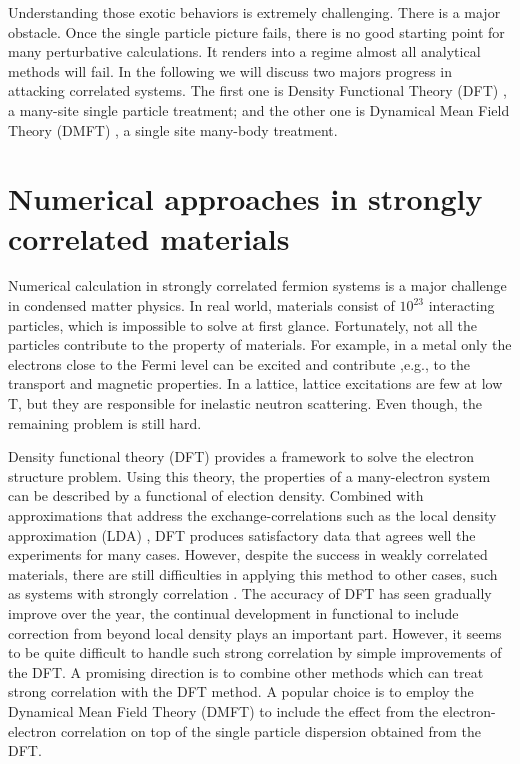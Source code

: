 Understanding those exotic behaviors is extremely challenging. There is a major
obstacle. Once the single particle picture fails, there
is no good starting point for many perturbative calculations. It renders
into a regime almost all analytical methods will fail. In the following we 
will discuss two majors progress in attacking correlated systems. The first one 
is Density Functional Theory (DFT)\cite{PhysRev.136.B864,PhysRev.140.A1133} , 
a many-site single particle treatment; 
and the other one is Dynamical Mean Field Theory (DMFT) \cite{RevModPhys.68.13,PhysRevB.45.6479}, 
a single site many-body treatment. 

\section{Numerical approaches in strongly correlated materials}
Numerical calculation in strongly correlated fermion systems is a major 
challenge in condensed matter physics. In real world, materials consist of 
$10^{23}$ interacting particles, which is impossible to solve at first glance. 
Fortunately, not all the particles contribute to the property of materials. For 
example, in a metal only the electrons close to the Fermi level can be excited 
and contribute ,e.g., to the transport and magnetic properties. In a lattice, 
lattice excitations are few at low T, but they are responsible for inelastic 
neutron scattering. Even though, the remaining problem is still hard. 

Density functional theory (DFT)\cite{PhysRev.136.B864,PhysRev.140.A1133} 
provides a framework to solve the 
electron structure problem. Using this theory, the properties of a many-electron
system can be described by a functional of election density. Combined with 
approximations that address the exchange-correlations such as the local density 
approximation (LDA) \cite{lundqvist1983}, DFT produces satisfactory data that agrees well the 
experiments for many cases. However, despite the success in weakly correlated 
materials, there are still difficulties in applying this method to other 
cases, such as systems with strongly correlation \cite{0953-8984-9-35-010}. 
The accuracy of DFT has seen gradually improve over the year, the continual
development in functional to include correction from beyond local density 
plays an important part. However, it seems to be quite
difficult to handle such strong correlation by simple improvements of the 
DFT. A promising direction is to combine other methods which can treat
strong correlation with the DFT method. A popular choice is to employ 
the Dynamical Mean Field Theory\citep{RevModPhys.68.13,PhysRevB.45.6479} (DMFT)
to include the effect from the electron-electron
correlation on top of the single particle dispersion obtained from the DFT. 

